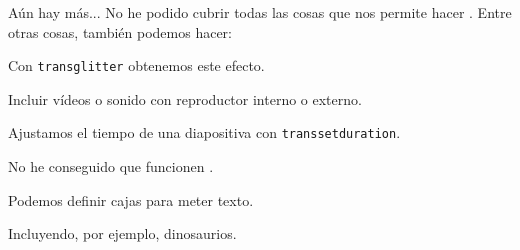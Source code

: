 \begin{frame}{Aún hay más...}
  \hypertarget{end}{}
  No he podido cubrir todas las cosas que nos permite hacer \beamer \frownie{}.
  Entre otras cosas, también podemos hacer:
  \espacio
  \begin{description}[<+->]
    \item[Transiciones] Con \texttt{transglitter} obtenemos este efecto.
    \item[Multimedia] Incluir vídeos o sonido con reproductor interno o externo.
    \item[Temporización] Ajustamos el tiempo de una diapositiva con \texttt{transsetduration}.
    \item[Animaciones] No he conseguido que funcionen \frownie{}.
    \item[Cajas] Podemos definir cajas para meter texto.
    \item[Overlays de imágenes] Incluyendo, por ejemplo, dinosaurios.
  \end{description}
  \espacio

\end{frame}
